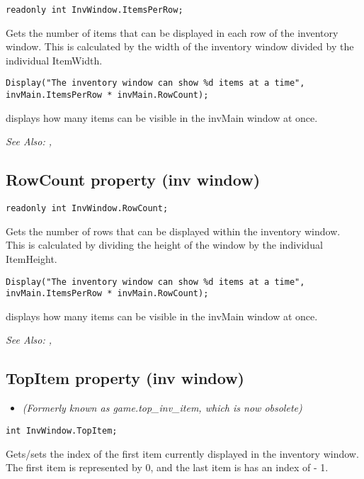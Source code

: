 \begin{verbatim}
readonly int InvWindow.ItemsPerRow;
\end{verbatim}
Gets the number of items that can be displayed in each row of the inventory window.
This is calculated by the width of the inventory window divided by the individual ItemWidth.

\begin{verbatim}
Display("The inventory window can show %d items at a time", invMain.ItemsPerRow * invMain.RowCount);
\end{verbatim}
displays how many items can be visible in the invMain window at once.

\it{See Also:} ,


\subsection{RowCount property (inv window)}\label{InvWindow.RowCount}%

\begin{verbatim}
readonly int InvWindow.RowCount;
\end{verbatim}
Gets the number of rows that can be displayed within the inventory window. This is
calculated by dividing the height of the window by the individual ItemHeight.

\begin{verbatim}
Display("The inventory window can show %d items at a time", invMain.ItemsPerRow * invMain.RowCount);
\end{verbatim}
displays how many items can be visible in the invMain window at once.

\it{See Also:} ,


\subsection{TopItem property (inv window)}\label{InvWindow.TopItem}%

\begin{itemize}
\item \it{(Formerly known as game.top_inv_item, which is now obsolete)}
\end{itemize}

\begin{verbatim}
int InvWindow.TopItem;
\end{verbatim}
Gets/sets the index of the first item currently displayed in the inventory window.
The first item is represented by 0, and the last item is has an index of
 - 1.


